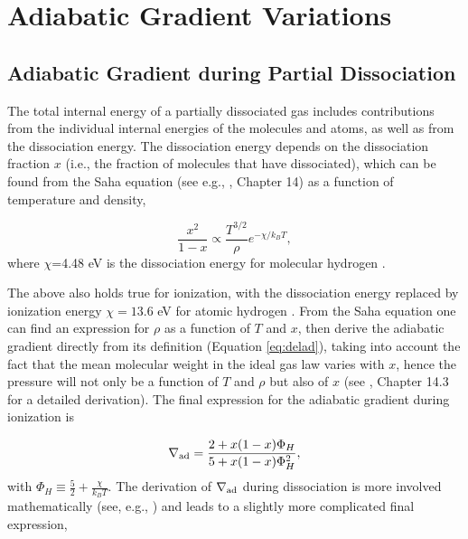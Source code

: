 \chapter{Adiabatic Gradient Variations}
\label{alldelad}

\section{Adiabatic Gradient during Partial Dissociation}\label{deladdiss}



The total internal energy of a partially dissociated gas includes contributions from the individual internal energies of the molecules and atoms, as well as from the dissociation energy. The dissociation energy depends on the dissociation fraction $x$ (i.e., the fraction of molecules that have dissociated), which can be found from the Saha equation (see e.g., \citealt{kippenhahn90}, Chapter 14) as a function of temperature and density,

\begin{equation}
\label{eq:saha}
\frac{x^2}{1-x} \propto \frac{T^{3/2}}{\rho} e^{-\chi/k_B T},
\end{equation} 
where $\chi$=4.48 eV is the dissociation energy for molecular hydrogen \citep{blanksby03}.

The above also holds true for ionization, with the dissociation energy replaced by ionization energy $\chi=13.6$ eV for atomic hydrogen \citep{mandl89}. From the Saha equation one can find an expression for $\rho$ as a function of $T$ and $x$, then derive the adiabatic gradient directly from its definition (Equation \ref{eq:delad}), taking into account the fact that the mean molecular weight in the ideal gas law varies with $x$, hence the pressure will not only be a function of $T$ and $\rho$ but also of $x$ (see \citealt{kippenhahn90}, Chapter 14.3 for a detailed derivation). The final expression for the adiabatic gradient during ionization is 

\begin{equation}
\label{eq:deladioniz}
\nabla_{\rm ad}=\frac{2+x (1-x) \Phi_H}{5+x(1-x)\Phi_H^2},
\end{equation}
with $\Phi_H \equiv \frac{5}{2}+\frac{\chi}{k_B T}$. The derivation of $\nabla_{\rm ad}$ during dissociation is more involved mathematically (see, e.g., \citealt{vardya60}) and leads to a slightly more complicated final expression,

